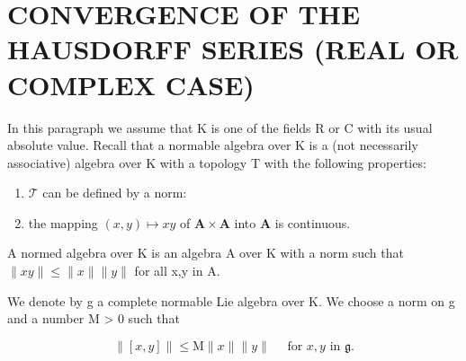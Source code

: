 \section{CONVERGENCE OF THE HAUSDORFF SERIES (REAL OR COMPLEX CASE)}

In this paragraph we assume that K is one of the fields R or C with its usual absolute value. Recall that a normable algebra over K is a (not necessarily associative) algebra over K with a topology T with the following properties:

\begin{enumerate}
\def\labelenumi{(\arabic{enumi})}
\item
  \(\mathcal{T}\) can be defined by a norm:
\item
  the mapping \((x,y)\mapsto xy\) of \(\mathbf{A}\times \mathbf{A}\) into \(\mathbf{A}\) is continuous.
\end{enumerate}

A normed algebra over K is an algebra A over K with a norm such that \(\|xy\|\leqslant\|x\|\|y\|\) for all x,y in A.

We denote by g a complete normable Lie algebra over K. We choose a norm on g and a number M > 0 such that

\[
\| [ x, y ] \| \leqslant \mathrm{M} \| x \| \| y \| \quad \text { for } x, y \text { in } \mathfrak {g}.\tag{1}
\]

